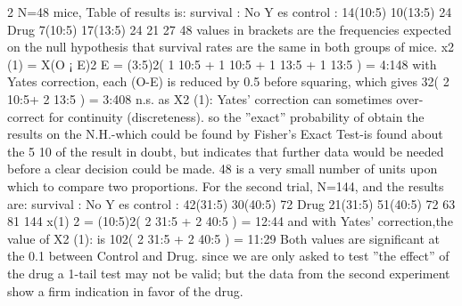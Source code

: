 2 N=48 mice, Table of results is:
survival : No Y es
control : 14(10:5) 10(13:5) 24
Drug 7(10:5) 17(13:5) 24
21 27 48
values in brackets are the frequencies expected on the null hypothesis that survival rates
are the same in both groups of mice.
x2
(1) =
X(O ¡ E)2
E
= (3:5)2(
1
10:5
+
1
10:5
+
1
13:5
+
1
13:5
) = 4:148
with Yates correction, each (O-E) is reduced by 0.5 before squaring, which gives 32( 2
10:5+
2
13:5 ) = 3:408 n.s. as X2
(1):
Yates’ correction can sometimes over-correct for continuity (discreteness). so the ”exact”
probability of obtain the results on the N.H.-which could be found by Fisher’s
Exact Test-is found about the 5%
10
of the result in doubt, but indicates that further data would be needed before a clear
decision could be made. 48 is a very small number of units upon which to compare two
proportions.
For the second trial, N=144, and the results are:
survival : No Y es
control : 42(31:5) 30(40:5) 72
Drug 21(31:5) 51(40:5) 72
63 81 144
x(1)
2 = (10:5)2(
2
31:5
+
2
40:5
) = 12:44
and with Yates’ correction,the value of X2
(1): is 102( 2
31:5 + 2
40:5 ) = 11:29
Both values are significant at the 0.1%
between Control and Drug.
since we are only asked to test ”the effect” of the drug a 1-tail test may not be valid;
but the data from the second experiment show a firm indication in favor of the drug.
